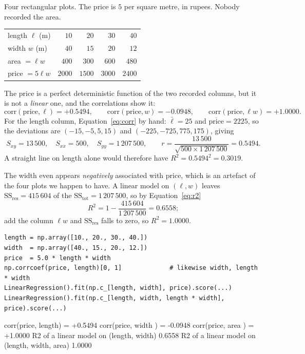\documentclass[11pt]{article}
\begin{document}
\begin{worked}
Four rectangular plots. The price is $5$ per square metre, in rupees. Nobody
recorded the area.
\begin{center}
\begin{tabular}{@{}lrrrr@{}}
\toprule
length $\ell$ (m) & $10$ & $20$ & $30$ & $40$\\
width $w$ (m)     & $40$ & $15$ & $20$ & $12$\\
\midrule
area $= \ell w$   & $400$ & $300$ & $600$ & $480$\\
price $= 5\ell w$ & $2000$ & $1500$ & $3000$ & $2400$\\
\bottomrule
\end{tabular}
\end{center}
The price is a perfect deterministic function of the two recorded columns, but
it is not a \emph{linear} one, and the correlations show it:
\[
  \mathrm{corr}(\text{price}, \ell) = +0.5494, \qquad
  \mathrm{corr}(\text{price}, w) = -0.0948, \qquad
  \mathrm{corr}(\text{price}, \ell w) = +1.0000 .
\]
For the length column, Equation~\eqref{eq:corr} by hand: $\bar\ell = 25$ and
$\overline{\text{price}} = 2225$, so the deviations are $(-15, -5, 5, 15)$ and
$(-225, -725, 775, 175)$, giving
\[
  S_{xy} = 13\,500, \quad S_{xx} = 500, \quad S_{yy} = 1\,207\,500, \qquad
  r = \frac{13\,500}{\sqrt{500 \times 1\,207\,500}} = 0.5494 .
\]
A straight line on length alone would therefore have
$R^2 = 0.5494^2 = 0.3019$.

The width even appears \emph{negatively} associated with price, which is an
artefact of the four plots we happen to have. A linear model on $(\ell, w)$
leaves $\mathrm{SS}_{\mathrm{res}} = 415\,604$ of the
$\mathrm{SS}_{\mathrm{tot}} = 1\,207\,500$, so by Equation~\eqref{eq:r2}
\[
  R^2 = 1 - \frac{415\,604}{1\,207\,500} = 0.6558 ;
\]
add the column $\ell w$ and $\mathrm{SS}_{\mathrm{res}}$ falls to zero, so
$R^2 = 1.0000$.
\end{worked}

\begin{lstlisting}
length = np.array([10., 20., 30., 40.])
width  = np.array([40., 15., 20., 12.])
price  = 5.0 * length * width
np.corrcoef(price, length)[0, 1]             # likewise width, length * width
LinearRegression().fit(np.c_[length, width], price).score(...)
LinearRegression().fit(np.c_[length, width, length * width], price).score(...)
\end{lstlisting}
\begin{codeout}
corr(price, length) = +0.5494
corr(price, width ) = -0.0948
corr(price, area  ) = +1.0000
R2 of a linear model on (length, width)       0.6558
R2 of a linear model on (length, width, area) 1.0000
\end{codeout}
\end{document}
